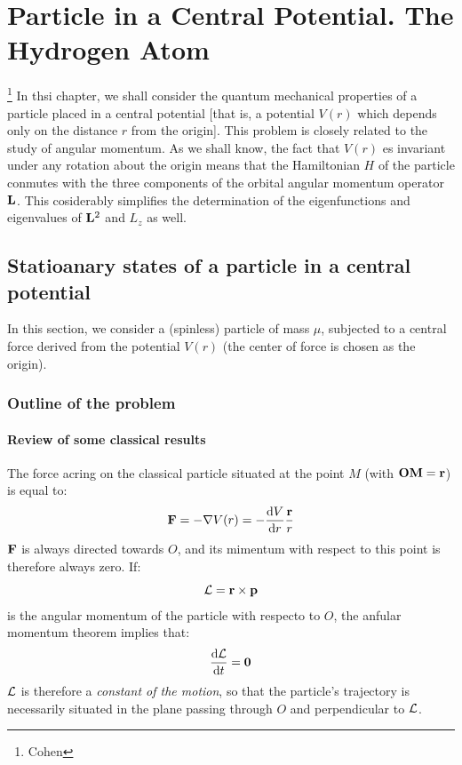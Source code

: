 \chapter{Particle in a Central Potential. The Hydrogen Atom}\footnote{Cohen}
In thsi chapter, we shall consider the quantum mechanical properties of a particle placed in a central potential [that is, a potential $V(r)$ which depends only on the distance $r$ from the origin]. This problem is closely related to the study of angular momentum. As we shall know, the fact that $V(r)$ es invariant under any rotation about the origin means that the Hamiltonian $H$ of the particle conmutes with the three components of the orbital angular momentum operator $\vb{L}$. This cosiderably simplifies the determination of the eigenfunctions and eigenvalues of $\vb{L}^2$ and $L_z$ as well.



\section{Statioanary states of a particle in a central potential}
In this section, we consider a (spinless) particle of mass $\mu$, subjected to a central force derived from the potential $V(r)$ (the center of force is chosen as the origin).
\subsection{Outline of the problem}
\subsubsection{Review of some classical results}
The force acring on the classical particle situated at the point $M$ (with $\vb{OM}=\vb{r}$) is equal to:
\begin{equation}\label{A-1}
	\vb{F}=-\nabla V(r)=-\dv{V}{r}\frac{\vb{r}}{r}
\end{equation}
$\vb{F}$ is always directed towards $O$,  and its mimentum with respect to this point is therefore always zero. If:
\begin{equation}\label{A-2}
	\vb{\mathcal{L}}=\vb{r}\times\vb{p}
\end{equation}
is the angular momentum of the particle with respecto to $O$, the anfular momentum theorem implies that:
\begin{equation}\label{A-3}
	\dv{\vb{\mathcal{L}}}{t}=\vb{0}
\end{equation}
$\vb{\mathcal{L}}$ is therefore a \textit{constant of the motion}, so that the particle's trajectory is necessarily situated in the plane passing through $O$ and perpendicular to $\vb{\mathcal{L}}$.


